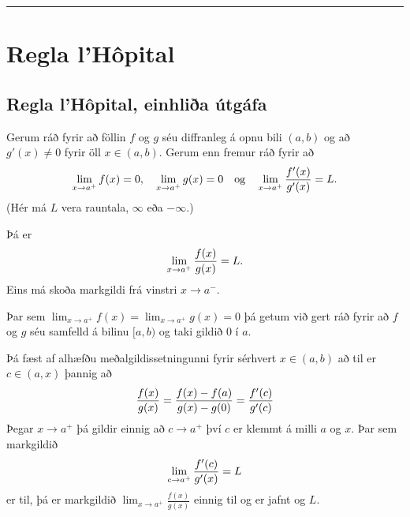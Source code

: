 \documentclass[a4paper,10pt,icelandic]{sphinxmanual}
\begin{document}

\bigskip\hrule{}\bigskip



\section{Regla l’Hôpital}
\label{kafli03:index-15}\label{kafli03:regla-lhopital}

\subsection{Regla l’Hôpital, einhliða útgáfa}
\label{kafli03:regla-lhopital-einhlia-utgafa}
Gerum ráð fyrir að föllin \(f\) og \(g\) séu diffranleg á opnu
bili \((a,
b)\) og að \(g'(x)\neq 0\) fyrir öll \(x\in (a, b)\). Gerum enn
fremur ráð fyrir að
\begin{gather}
\begin{split}\lim_{x\rightarrow a^+}f(x)=0, \quad \lim_{x\rightarrow a^+}g(x)=0
\quad\mbox{og}\quad \lim_{x\rightarrow a^+}\frac{f'(x)}{g'(x)}=L.\end{split}\notag
\end{gather}
(Hér má \(L\) vera rauntala, \(\infty\) eða \(-\infty\).)

Þá er
\begin{gather}
\begin{split}\lim_{x\rightarrow a^+}\frac{f(x)}{g(x)}=L.\end{split}\notag
\end{gather}
Eins má skoða markgildi frá vinstri \(x\to a^-\).

Þar sem \(\lim_{x\rightarrow a^+}f(x)=\lim_{x\rightarrow a^+}g(x)=0\)
þá getum við gert ráð fyrir að \(f\) og \(g\) séu samfelld á
bilinu \([a,b)\) og taki gildið 0 í \(a\).

Þá fæst af alhæfðu meðalgildissetningunni fyrir sérhvert \(x\in (a,b)\)
að til er \(c \in (a,x)\) þannig að
\begin{gather}
\begin{split}\frac{f(x)}{g(x)} = \frac{f(x)-f(a)}{g(x)-g(0)} = \frac{f'(c)}{g'(c)}\end{split}\notag
\end{gather}
Þegar \(x \to a^+\) þá gildir einnig að \(c \to a^+\) því
\(c\) er klemmt á milli \(a\) og \(x\).
Þar sem markgildið
\begin{gather}
\begin{split}\lim_{c\to a^+} \frac{f'(c)}{g'(x)} = L\end{split}\notag
\end{gather}
er til, þá er markgildið \(\lim_{x\rightarrow a^+}\frac{f(x)}{g(x)}\)
einnig til og er jafnt og \(L\).
\end{document}
